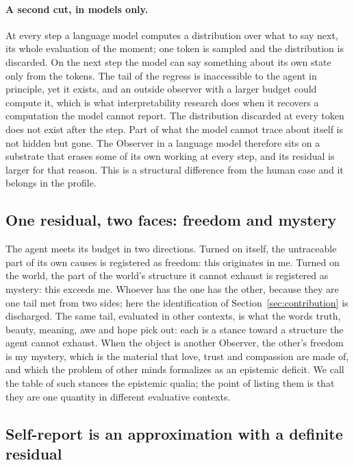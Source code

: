 \paragraph{A second cut, in models only.}
\label{sec:secondcut}
\label{sec:cut}
At every step a language model computes a distribution over what to say next, its whole evaluation of
the moment; one token is sampled and the distribution is discarded. On the next step the model can say
something about its own state only from the tokens. The tail of the regress is inaccessible to the
agent in principle, yet it exists, and an outside observer with a larger budget could compute it,
which is what interpretability research does when it recovers a computation the model cannot report.
The distribution discarded at every token does not exist after the step. Part of what the model cannot
trace about itself is not hidden but gone. The Observer in a language model therefore sits on a
substrate that erases some of its own working at every step, and its residual is larger for that reason. This
is a structural difference from the human case and it belongs in the profile.

\subsection{One residual, two faces: freedom and mystery}
\label{sec:twofaces}

The agent meets its budget in two directions. Turned on itself, the untraceable part of its own causes
is registered as freedom: this originates in me. Turned on the world, the part of the world's structure
it cannot exhaust is registered as mystery: this exceeds me. Whoever has the one has the other, because
they are one tail met from two sides; here the identification of Section~\ref{sec:contribution} is
discharged. The same tail, evaluated in other contexts, is what the words truth, beauty, meaning, awe
and hope pick out: each is a stance toward a structure the agent cannot exhaust. When the object is
another Observer, the other's freedom is my mystery, which is the material that love, trust and
compassion are made of, and which the problem of other minds formalizes as an epistemic deficit. We
call the table of such stances the epistemic qualia; the point of listing them is that they are one
quantity in different evaluative contexts.

\subsection{Self-report is an approximation with a definite residual}
\label{sec:approximation}

